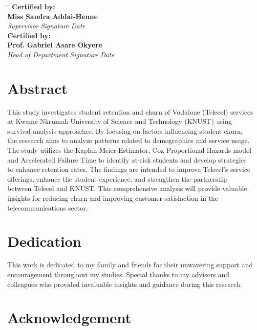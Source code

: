 \documentclass[doublespacing]{report} %
\begin{document}
\begin{tabbing}
 \hspace{6cm} \= \hspace{4cm} \= \hspace{5cm} \kill
     \textbf{Certified by:}\\ 
    \textbf{Miss Sandra Addai-Henne} \> \makebox[3cm]{\dotfill} \> \makebox[3cm]{\dotfill} \\
    \textit{Supervisor} \> \textit{Signature} \> \textit{Date} \\[1.5cm]
    \textbf{Certified by:}\\ 
\textbf{Prof. Gabriel Asare Okyere } \> \makebox[3cm]{\dotfill} \> \makebox[3cm]{\dotfill} \\
    \textit{Head of Department} \> \textit{Signature} \> \textit{Date}
\end{tabbing}



 
\newpage
\chapter*{Abstract}
This study investigates student retention and churn of Vodafone (Telecel) services at Kwame Nkrumah University of Science and Technology (KNUST) using survival analysis approaches. By focusing on factors influencing student churn, the research aims to analyze patterns related to demographics and service usage. The study utilizes the Kaplan-Meier Estimator, Cox Proportional Hazards model and Accelerated Failure Time to identify at-risk students and develop strategies to enhance retention rates. The findings are intended to improve Telecel’s service offerings, enhance the student experience, and strengthen the partnership between Telecel and KNUST. This comprehensive analysis will provide valuable insights for reducing churn and improving customer satisfaction in the telecommunications sector.

\newpage
\chapter*{Dedication}
This work is dedicated to my family and friends for their unwavering support and encouragement throughout my studies. Special thanks to my advisors and colleagues who provided invaluable insights and guidance during this research.

\newpage
\chapter*{Acknowledgement}
\end{document}
